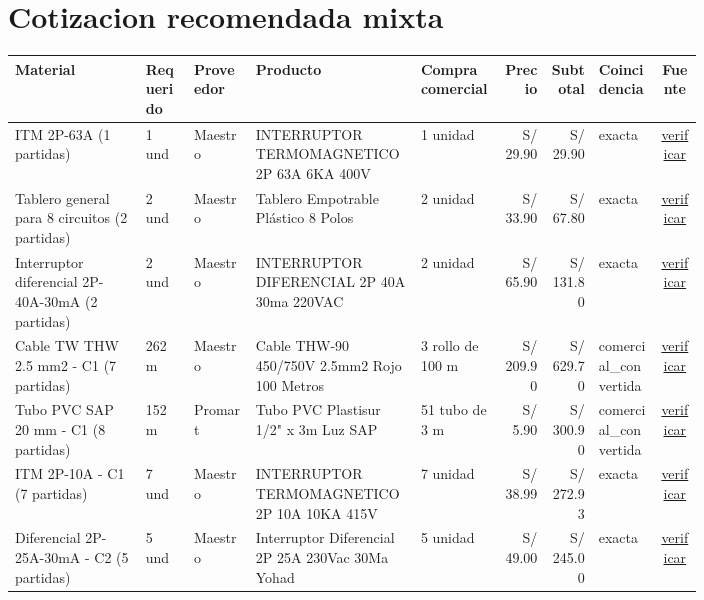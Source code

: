\documentclass[11pt,a4paper]{article}
\begin{document}
\section{Cotizacion recomendada mixta}
\begin{landscape}
\small
\begin{longtable}{p{0.19\linewidth} p{0.07\linewidth} p{0.09\linewidth} p{0.24\linewidth} p{0.12\linewidth} r r p{0.09\linewidth} c}
\toprule Material & Requerido & Proveedor & Producto & Compra comercial & Precio & Subtotal & Coincidencia & Fuente \\ \midrule\endhead
ITM 2P-63A (1 partidas) & 1 und & Maestro & INTERRUPTOR TERMOMAGNETICO 2P 63A 6KA 400V & 1 unidad & S/ 29.90 & S/ 29.90 & exacta & \href{\detokenize{https://www.falabella.com.pe/falabella-pe/search?Ntt=interruptor+termomagnetico+2+polos+63A}}{verificar} \\
Tablero general para 8 circuitos (2 partidas) & 2 und & Maestro & Tablero Empotrable Plástico 8 Polos & 2 unidad & S/ 33.90 & S/ 67.80 & exacta & \href{\detokenize{https://www.falabella.com.pe/falabella-pe/search?Ntt=tablero+electrico+8+polos+empotrable}}{verificar} \\
Interruptor diferencial 2P-40A-30mA (2 partidas) & 2 und & Maestro & INTERRUPTOR DIFERENCIAL 2P 40A 30ma 220VAC & 2 unidad & S/ 65.90 & S/ 131.80 & exacta & \href{\detokenize{https://www.falabella.com.pe/falabella-pe/search?Ntt=interruptor+diferencial+2+polos+40A+30mA}}{verificar} \\
Cable TW THW 2.5 mm2 - C1 (7 partidas) & 262 m & Maestro & Cable THW-90 450/750V 2.5mm2 Rojo 100 Metros & 3 rollo de 100 m & S/ 209.90 & S/ 629.70 & comercial\_convertida & \href{\detokenize{https://www.falabella.com.pe/falabella-pe/search?Ntt=cable+electrico+thw+2.5+mm2+cobre}}{verificar} \\
Tubo PVC SAP 20 mm - C1 (8 partidas) & 152 m & Promart & Tubo PVC Plastisur 1/2" x 3m Luz SAP & 51 tubo de 3 m & S/ 5.90 & S/ 300.90 & comercial\_convertida & \href{\detokenize{https://www.promart.pe/tubo-pvc-plastisur-1-2-x-3m-luz-sap-162918/p}}{verificar} \\
ITM 2P-10A - C1 (7 partidas) & 7 und & Maestro & INTERRUPTOR TERMOMAGNETICO 2P 10A 10KA 415V & 7 unidad & S/ 38.99 & S/ 272.93 & exacta & \href{\detokenize{https://www.falabella.com.pe/falabella-pe/search?Ntt=interruptor+termomagnetico+2+polos+10A}}{verificar} \\
Diferencial 2P-25A-30mA - C2 (5 partidas) & 5 und & Maestro & Interruptor Diferencial 2P 25A 230Vac 30Ma Yohad & 5 unidad & S/ 49.00 & S/ 245.00 & exacta & \href{\detokenize{https://www.falabella.com.pe/falabella-pe/search?Ntt=interruptor+diferencial+2+polos+25A+30mA}}{verificar} \\

\end{longtable}
\end{landscape}
\end{document}
